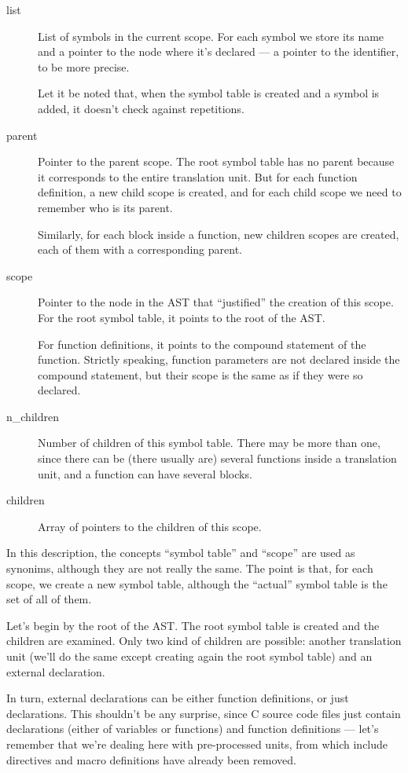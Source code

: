 \documentclass[a4paper,openany]{article}
\begin{document}
\begin{description}
\item[list] List of symbols in the current scope. For each symbol we store its name and a pointer to the node where it's declared --- a pointer to the identifier, to be more precise.

Let it be noted that, when the symbol table is created and a symbol is added, it doesn't check against repetitions.

\item[parent] Pointer to the parent scope. The root symbol table has no parent because it corresponds to the entire translation unit. But for each function definition, a new child scope is created, and for each child scope we need to remember who is its parent.

Similarly, for each block inside a function, new children scopes are created, each of them with a corresponding parent.

\item[scope] Pointer to the node in the AST that ``justified'' the creation of this scope. For the root symbol table, it points to the root of the AST.

For function definitions, it points to the compound statement of the function. Strictly speaking, function parameters are not declared inside the compound statement, but their scope is the same as if they were so declared.

\item[n\_children] Number of children of this symbol table. There may be more than one, since there can be (there usually are) several functions inside a translation unit, and a function can have several blocks.

\item[children] Array of pointers to the children of this scope.
\end{description}

In this description, the concepts ``symbol table'' and ``scope'' are used as synonims, although they are not really the same. The point is that, for each scope, we create a new symbol table, although the ``actual'' symbol table is the set of all of them.

Let's begin by the root of the AST. The root symbol table is created and the children are examined. Only two kind of children are possible: another translation unit (we'll do the same except creating again the root symbol table) and an external declaration.

In turn, external declarations can be either function definitions, or just declarations. This shouldn't be any surprise, since C source code files just contain declarations (either of variables or functions) and function definitions --- let's remember that we're dealing here with pre-processed units, from which include directives and macro def\-in\-itions have already been removed.
\end{document}

